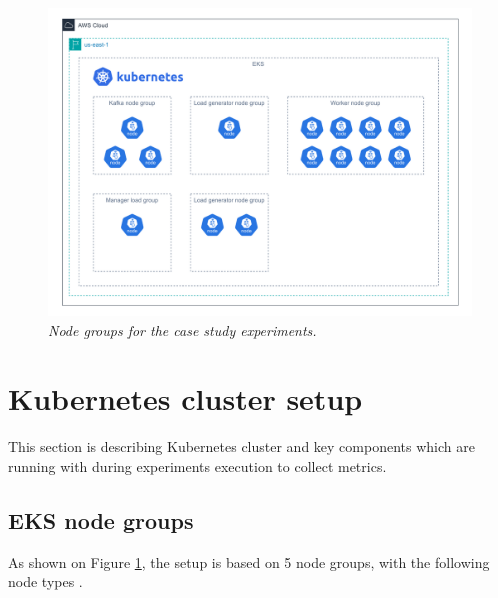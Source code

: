 \begin{figure}[ht]
    \centering
    \includegraphics[width=1\textwidth]{figures/eks-node-groups}
    \caption{\textit{Node groups for the case study experiments.}}
    \label{fig:node-gorups}
\end{figure}


\newpage
\section{Kubernetes cluster setup}\label{subsec:eks-cluster-configuration}
This section is describing Kubernetes cluster and key components which are running
with during experiments execution to collect metrics.

\subsection{EKS node groups}\label{node-groups}

As shown on Figure \ref{fig:node-gorups}, the setup is based on 5 node groups, with the following
node types \cite{aws_node_types}.

